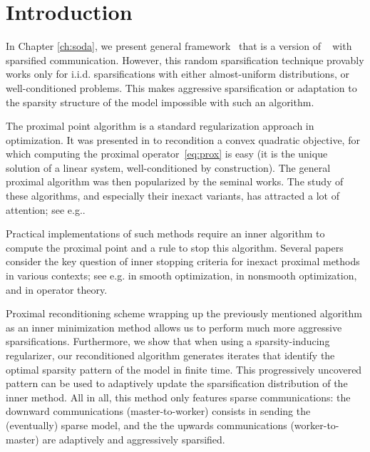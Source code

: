 \section*{Introduction}\label{sec:reco-intro}
In Chapter \ref{ch:soda}, we present general framework \spy~that is a version of \dave~\cite{ICML18} with sparsified communication. However, this random sparsification technique provably works only for i.i.d. sparsifications with either almost-uniform distributions, or well-conditioned problems. This makes aggressive sparsification or adaptation to the sparsity structure of the model impossible with such an algorithm.

The proximal point algorithm is a standard regularization approach in optimization. It was presented in \cite[Chap.\,5]{bkl} to recondition a convex quadratic objective, for which computing the proximal operator~\eqref{eq:prox} is easy (it is the unique solution of a linear system, well-conditioned by construction). The general proximal algorithm was then popularized by the seminal works\;\cite{martinet-1970,rockafellar1976monotone}. The study of these algorithms, and especially their inexact variants, has attracted a lot of attention; see e.g.\;\cite{guler1992new,solodov2000error,fuentes,lin2017catalyst,lin2019inexact}. 

Practical implementations of such methods require an inner algorithm to compute the proximal point and a rule to stop this algorithm. Several papers consider the key question of inner stopping criteria for inexact proximal methods in various contexts; see e.g.\;\cite{fuentes} in smooth optimization, \cite{lemarechal-sagastizabal-1997} in nonsmooth optimization,
and \cite{solodov-svaiter-2001} in operator theory.%

Proximal reconditioning scheme wrapping up the previously mentioned algorithm as an inner minimization method allows us to perform much more aggressive sparsifications. Furthermore, we show that when using a sparsity-inducing regularizer, our reconditioned algorithm generates iterates that identify the optimal sparsity pattern of the model in finite time. This progressively uncovered pattern can be used to adaptively update the sparsification distribution of the inner method. All in all, this method only features sparse communications: the downward communications (master-to-worker) consists in sending the (eventually) sparse model, and the the upwards communications (worker-to-master) are adaptively and aggressively sparsified.


